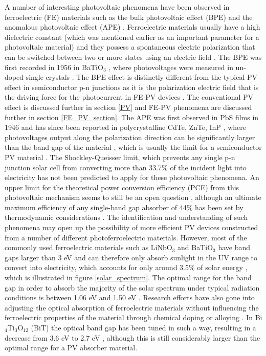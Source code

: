 A number of interesting photovoltaic phenomena have been observed in ferroelectric (FE) materials  such as the bulk photovoltaic effect (BPE) and the anomalous photovoltaic effect (APE) \cite{keith}. Ferroelectric materials usually have a high dielectric constant (which was mentioned earlier as an important parameter for a photovoltaic material) and they possess a spontaneous electric polarization that can be switched between two or more states using an electric field \cite{new_FE_PV_1}.
The BPE was first recorded in 1956 in BaTiO$_3$ \cite{keith_46}, where photovoltages were measured in un-doped single crystals \cite{keith}.
The BPE effect is distinctly different from the typical PV effect in semiconductor
p-n junctions as it is the polarization electric field that is the driving force for the photocurrent in FE-PV devices \cite{FE_PV_rev1}. The conventional PV effect is discussed further in section \ref{PV} and FE-PV phenomena are discussed further in section \ref{FE_PV_section}.
The APE was first observed in PbS films in 1946 \cite{keith_54} and has since been reported in polycrystalline CdTe, ZnTe, InP \cite{keith_55, keith_56, keith_57}, where photovoltages output along the polarization direction can be significantly larger than the band gap of the material \cite{FE_PV_rev1}, which is usually the limit for a semiconductor PV material \cite{keith}. 
The Shockley-Queisser limit, which prevents any single p-n junction solar cell from converting more than 33.7\% of the incident light into electricity has not been predicted to apply for these photovoltaic phenomena. An upper limit for the theoretical power conversion efficiency (PCE) from this photovoltaic mechanism seems to still be an open question \cite{new_FE_PV}, although an ultimate maximum efficiency of any single-band gap absorber of 44\% has been set by thermodynamic considerations \cite{SQ_1961}.
The identification and understanding of such phenomena may open up the possibility of more efficient PV devices constructed from a number of different photoferroelectric materials. However, most of the commonly used ferroelectric materials such as LiNbO$_3$ and BaTiO$_3$ have band gaps larger than 3 eV and can therefore only absorb sunlight in the UV range to convert into electricity, which accounts for only around 3.5\% of solar energy \cite{FE_PV_rev1}, which is illustrated in figure \ref{solar_spectrum}. The optimal range for the band gap in order to absorb the majority of the solar spectrum under typical radiation conditions is between 1.06 eV and 1.50 eV \cite{CZTS_book}. Research efforts have also gone into adjusting the optical absorption of ferroelectric materials without influencing the ferroelectric properties of the material through chemical doping or alloying \cite{FE_PV_rev1}. In Bi$_4$Ti$_3$O$_{12}$ (BiT) the optical band gap has been tuned in such a way, resulting in a decrease from 3.6 eV to 2.7 eV \cite{FE_PV_rev1_83}, although this is still considerably larger than the optimal range for a PV absorber material.\\

